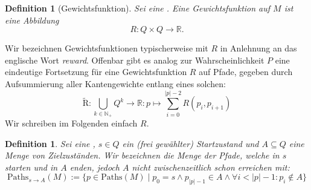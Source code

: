 \documentclass[a4paper]{article}
\newtheorem{definition}[satz]{Definition} %
\theoremstyle{nonumberplain}
\begin{document}
\newcommand{\reward}{Gewichtsfunktion}
\begin{definition}[\reward]
	Sei \mcex{} eine \mc{}. Eine \reward{} auf $M$ ist eine Abbildung
	\begin{equation}
	R : Q \times Q \to \mathbb{R}\text{.}
	\end{equation} 
\end{definition}
Wir bezeichnen Gewichtsfunktionen typischerweise mit $R$ in Anlehnung an das englische Wort \textit{reward}.
Offenbar gibt es analog zur Wahrscheinlichkeit $P$ eine eindeutige Fortsetzung für eine \reward{} $R$ auf Pfade, gegeben durch Aufsummierung aller Kantengewichte entlang eines solchen:
\begin{equation}
	\mathrm{\tilde{R}} : \bigcup_{k \in \mathbb{N}_+}{Q^k} \to \mathbb{R} : p \mapsto \sum_{i = 0}^{|p| - 2}{R(p_i,p_{i+1})}
\end{equation}
Wir schreiben im Folgenden einfach $R$.
\begin{definition}\label{def-path-to}
	Sei \mcex{} eine \mc{}, $s \in Q$ ein (frei gewählter) Startzustand und $A \subseteq Q$ eine Menge von Zielzuständen. Wir bezeichnen die Menge der Pfade, welche in $s$ starten und in $A$ enden, jedoch $A$ nicht zwischenzeitlich schon erreichen mit:
	\begin{equation}
		\mathrm{Paths}_{s \rightarrow A}(M) := \{ p \in \mathrm{Paths}(M) \mid p_0 = s \land p_{|p|-1} \in A \land \forall i < |p| - 1 : p_i \notin A \}
	\end{equation}
	
\end{definition}
\end{document}
